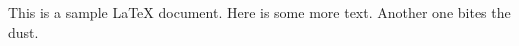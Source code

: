 \documentclass[11pt,letterpaper]{article}
\begin{document}
	This is a sample LaTeX document.
Here is some more text.	
Another one bites the dust.
\end{document}
